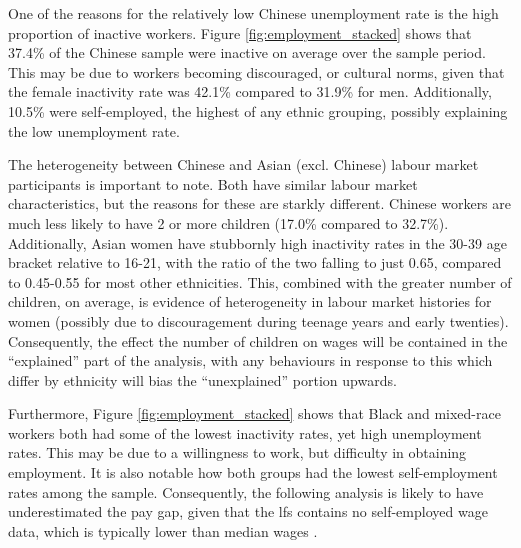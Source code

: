 \documentclass[class=article, crop=false]{standalone}
\begin{document}
One of the reasons for the relatively low Chinese unemployment rate is the high proportion of inactive workers. Figure \ref{fig:employment_stacked} shows that 37.4\% of the Chinese sample were inactive on average over the sample period. This may be due to workers becoming discouraged, or cultural norms, given that the female inactivity rate was 42.1\% compared to 31.9\% for men. Additionally, 10.5\% were self-employed, the highest of any ethnic grouping, possibly explaining the low unemployment rate.

The heterogeneity between Chinese and Asian (excl. Chinese) labour market participants is important to note. Both have similar labour market characteristics, but the reasons for these are starkly different. Chinese workers are much less likely to have 2 or more children (17.0\% compared to 32.7\%). Additionally, Asian women have stubbornly high inactivity rates in the 30-39 age bracket relative to 16-21, with the ratio of the two falling to just 0.65, compared to 0.45-0.55 for most other ethnicities. This, combined with the greater number of children, on average, is evidence of heterogeneity in labour market histories for women (possibly due to discouragement during teenage years and early twenties). Consequently, the effect the number of children on wages will be contained in the \enquote{explained} part of the analysis, with any behaviours in response to this which differ by ethnicity will bias the \enquote{unexplained} portion upwards.

Furthermore, Figure \ref{fig:employment_stacked} shows that Black and mixed-race workers both had some of the lowest inactivity rates, yet high unemployment rates. This may be due to a willingness to work, but difficulty in obtaining employment. It is also notable how both groups had the lowest self-employment rates among the sample. Consequently, the following analysis is likely to have underestimated the pay gap, given that the \acrshort{lfs} contains no self-employed wage data, which is typically lower than median wages \citep{GOVf}.

\end{document}
